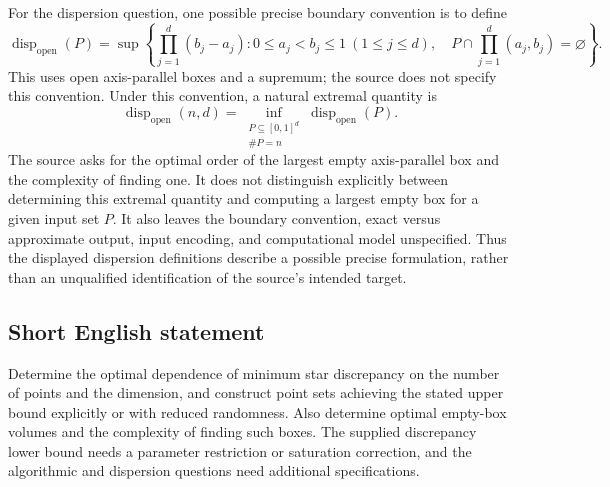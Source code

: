 \documentclass[11pt]{article}
\begin{document}
For the dispersion question, one possible precise boundary convention is to define
\[
\operatorname{disp}_{\mathrm{open}}(P)=
\sup\left\{\prod_{j=1}^d(b_j-a_j):
0\leq a_j<b_j\leq1\ (1\leq j\leq d),\quad
P\cap\prod_{j=1}^d(a_j,b_j)=\varnothing\right\}.
\]
This uses open axis-parallel boxes and a supremum; the source does not specify this convention. Under this convention, a natural extremal quantity is
\[
\operatorname{disp}_{\mathrm{open}}(n,d)=
\inf_{\substack{P\subseteq[0,1]^d\\\#P=n}}
\operatorname{disp}_{\mathrm{open}}(P).
\]
The source asks for the optimal order of the largest empty axis-parallel box and the complexity of finding one. It does not distinguish explicitly between determining this extremal quantity and computing a largest empty box for a given input set \(P\). It also leaves the boundary convention, exact versus approximate output, input encoding, and computational model unspecified. Thus the displayed dispersion definitions describe a possible precise formulation, rather than an unqualified identification of the source's intended target.
\subsection{Short English statement}
Determine the optimal dependence of minimum star discrepancy on the number of points and the dimension, and construct point sets achieving the stated upper bound explicitly or with reduced randomness. Also determine optimal empty-box volumes and the complexity of finding such boxes. The supplied discrepancy lower bound needs a parameter restriction or saturation correction, and the algorithmic and dispersion questions need additional specifications.
\end{document}
